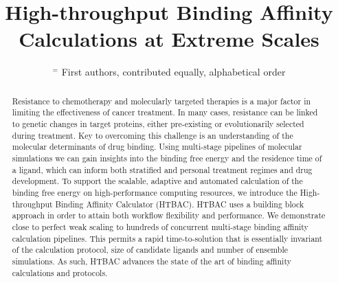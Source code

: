 \documentclass[conference]{IEEEtran}
\begin{document}
\title{High-throughput Binding Affinity Calculations at Extreme Scales}

\author{

    $^=$ First authors, contributed equally, alphabetical order
 }

\maketitle

%
%
%
\begin{abstract}
%
Resistance to chemotherapy and molecularly targeted therapies is a major
factor in limiting the effectiveness of cancer treatment. In many cases,
resistance can be linked to genetic changes in target proteins, either
pre-existing or evolutionarily selected during treatment. Key to overcoming
this challenge is an understanding of the molecular determinants of drug
binding. Using multi-stage pipelines of molecular simulations we can gain
insights into the binding free energy and the residence time of a ligand,
which can inform both stratified and personal treatment regimes and drug
development.
%
%
%
%
%
%
%
%
To support the scalable, adaptive and automated calculation of the binding
free energy on high-performance computing resources, we introduce the High-
throughput Binding Affinity Calculator (HTBAC). HTBAC uses a building block
approach in order to attain both workflow flexibility and
performance. We demonstrate close to perfect weak scaling to hundreds of
concurrent multi-stage binding affinity calculation pipelines. This permits
a rapid time-to-solution that is essentially invariant of the calculation
protocol, size of candidate ligands and number of ensemble simulations. As
such, HTBAC advances the state of the art of binding affinity calculations and
protocols.
 \end{abstract}
\end{document}
